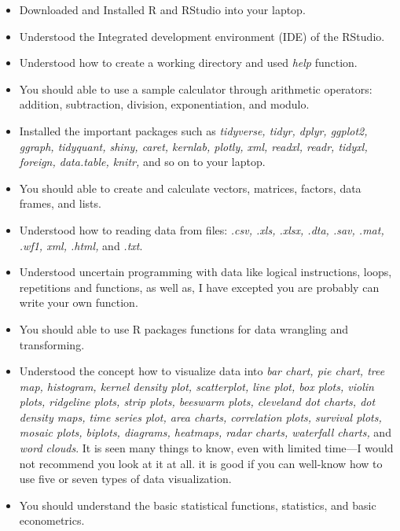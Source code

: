 \documentclass[11pt,a4paper]{letter}
\begin{document}
\begin{itemize}
	\item Downloaded and Installed R and RStudio into your laptop.
	\item Understood the Integrated development environment (IDE) of the RStudio. 
	\item Understood how to create a working directory and used \textit{help} function. 
	\item You should able to use a sample calculator through arithmetic operators: addition, subtraction, division, exponentiation, and modulo.
	\item Installed the important packages such as \textit{tidyverse, tidyr, dplyr, ggplot2, ggraph, tidyquant, shiny, caret, kernlab, plotly, xml, readxl, readr, tidyxl, foreign, data.table, knitr,} and so on to your laptop.  
	\item You should able to create and calculate vectors, matrices, factors, data frames, and lists.
	\item Understood how to reading data from files: \textit{.csv, .xls, .xlsx, .dta, .sav, .mat, .wf1, xml, .html,} and \textit{.txt}.
	\item Understood uncertain programming with data like logical instructions, loops, repetitions and functions, as well as, I have excepted you are probably can write your own function. 
	\item You should able to use R packages functions for data wrangling and transforming. 
	\item Understood the concept how to visualize data into \textit{bar chart, pie chart, tree map, histogram, kernel density plot,  scatterplot, line plot, box plots, violin plots, ridgeline plots, strip plots, beeswarm plots, cleveland dot charts, dot density maps, time series plot, area charts, correlation plots, survival plots, mosaic plots, biplots, diagrams, heatmaps, radar charts, waterfall charts,} and\textit{ word clouds}. It is seen many things to know, even with limited time---I would not recommend you look at it at all. it is good if you can well-know how to use five or seven types of data visualization.  
	\item You should understand the basic statistical functions, statistics, and basic econometrics. 
\end{itemize} 
 
\end{document}
